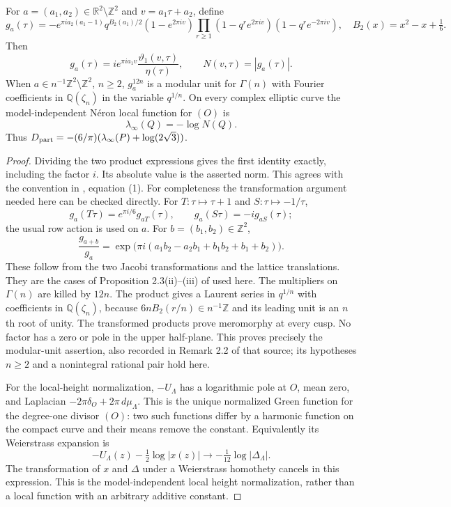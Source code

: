 \begin{statement}
For $a=(a_1,a_2)\in\mathbb R^2\setminus\mathbb Z^2$ and
$v=a_1\tau+a_2$, define
\[
 g_a(\tau)=-e^{\pi ia_2(a_1-1)}q^{B_2(a_1)/2}
 (1-e^{2\pi iv})\prod_{r\ge1}
 (1-q^re^{2\pi iv})(1-q^re^{-2\pi iv}),
 \quad B_2(x)=x^2-x+\tfrac16.
\]
Then
\[
 g_a(\tau)=i e^{\pi ia_1v}
       \frac{\vartheta_1(v,\tau)}{\eta(\tau)},\qquad
 N(v,\tau)=|g_a(\tau)|.
\]
When $a\in n^{-1}\mathbb Z^2\setminus\mathbb Z^2$, $n\ge2$,
$g_a^{12n}$ is a modular unit for $\Gamma(n)$ with Fourier coefficients
in $\mathbb Q(\zeta_n)$ in the variable $q^{1/n}$. On every complex
elliptic curve the model-independent Néron local function for $(O)$ is
\[
 \lambda_\infty(Q)=-\log N(Q).
\]
Thus $D_{\rm part}=-(6/\pi)(\lambda_\infty(P)+\log(2\sqrt3))$.
\end{statement}
\begin{proof}
Dividing the two product expressions gives the first identity exactly,
including the factor $i$. Its absolute value is the asserted norm.
This agrees with the convention in \cite{Shin2015}, equation (1).
For completeness the transformation argument needed here can be
checked directly. For $T:\tau\mapsto\tau+1$ and
$S:\tau\mapsto-1/\tau$,
\[
 g_a(T\tau)=e^{\pi i/6}g_{aT}(\tau),\qquad
 g_a(S\tau)=-i g_{aS}(\tau);
\]
the usual row action is used on $a$. For $b=(b_1,b_2)\in\mathbb Z^2$,
\[
 \frac{g_{a+b}}{g_a}
 =\exp\bigl(\pi i(a_1b_2-a_2b_1+b_1b_2+b_1+b_2)\bigr).
\]
These follow from the two Jacobi transformations and the lattice
translations. They are the cases of Proposition 2.3(ii)--(iii) of
\cite{Shin2015} used here. The multipliers on $\Gamma(n)$ are killed
by $12n$. The product gives a Laurent series in $q^{1/n}$ with
coefficients in $\mathbb Q(\zeta_n)$, because
$6nB_2(r/n)\in n^{-1}\mathbb Z$ and its leading unit is an $n$th
root of unity. The transformed products prove meromorphy at every
cusp. No factor has a zero or pole in the upper half-plane. This
proves precisely the modular-unit assertion, also recorded in
Remark 2.2 of that source; its hypotheses $n\ge2$ and a nonintegral
rational pair hold here.

For the local-height normalization, $-U_\Lambda$ has a logarithmic
pole at $O$, mean zero, and Laplacian
$-2\pi\delta_O+2\pi\,d\mu_\Lambda$. This is the unique normalized
Green function for the degree-one divisor $(O)$: two such functions
differ by a harmonic function on the compact curve and their means
remove the constant. Equivalently its Weierstrass expansion is
\[
 -U_\Lambda(z)-\tfrac12\log|x(z)|
             \longrightarrow-\tfrac1{12}\log|\Delta_\Lambda|.
\]
The transformation of $x$ and $\Delta$ under a Weierstrass homothety
cancels in this expression. This is the model-independent local
height normalization, rather than a local function with an arbitrary
additive constant.
\end{proof}


